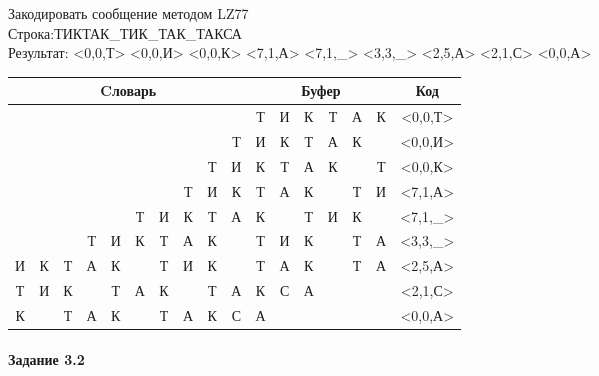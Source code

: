 \documentclass[a4paper, 12pt]{article}
\begin{document}
Закодировать сообщение методом LZ77\\
Строка:ТИКТАК\_ТИК\_ТАК\_ТАКСА\\
Результат: <0,0,Т> <0,0,И> <0,0,К> <7,1,А> <7,1,\_> <3,3,\_> <2,5,А> <2,1,С> <0,0,А>\\
\begin{table}[h!]
\centering
\begin{tabular}{|c|c|c|c|c|c|c|c|c|c|c|c|c|c|c|c|c|} 
\hline
\multicolumn{10}{|c|}{Cловарь} & \multicolumn{6}{c|}{Буфер} & Код  \\ \hline
  &   &   &   &   &   &   &   &   &   & \cellcolor[HTML]{8CE4F6} Т & И & К & Т & А & К & <0,0,Т>
\\ \hline
  &   &   &   &   &   &   &   &   & Т & \cellcolor[HTML]{8CE4F6} И & К & Т & А & К &   & <0,0,И>
\\ \hline
  &   &   &   &   &   &   &   & Т & И & \cellcolor[HTML]{8CE4F6} К & Т & А & К &   & Т & <0,0,К>
\\ \hline
  &   &   &   &   &   &   & \cellcolor[HTML]{FFFF00} Т & И & К & \cellcolor[HTML]{FFFF00} Т & \cellcolor[HTML]{8CE4F6} А & К &   & Т & И & <7,1,А>
\\ \hline
  &   &   &   &   & Т & И & \cellcolor[HTML]{FFFF00} К & Т & А & \cellcolor[HTML]{FFFF00} К & \cellcolor[HTML]{8CE4F6}   & Т & И & К &   & <7,1,\_>
\\ \hline
  &   &   & \cellcolor[HTML]{FFFF00} Т & \cellcolor[HTML]{FFFF00} И & \cellcolor[HTML]{FFFF00} К & Т & А & К &   & \cellcolor[HTML]{FFFF00} Т & \cellcolor[HTML]{FFFF00} И & \cellcolor[HTML]{FFFF00} К & \cellcolor[HTML]{8CE4F6}   & Т & А & <3,3,\_>
\\ \hline
И & К & \cellcolor[HTML]{FFFF00} Т & \cellcolor[HTML]{FFFF00} А & \cellcolor[HTML]{FFFF00} К & \cellcolor[HTML]{FFFF00}   & \cellcolor[HTML]{FFFF00} Т & И & К &   & \cellcolor[HTML]{FFFF00} Т & \cellcolor[HTML]{FFFF00} А & \cellcolor[HTML]{FFFF00} К & \cellcolor[HTML]{FFFF00}   & \cellcolor[HTML]{FFFF00} Т & \cellcolor[HTML]{8CE4F6} А & <2,5,А>
\\ \hline
Т & И & \cellcolor[HTML]{FFFF00} К &   & Т & А & К &   & Т & А & \cellcolor[HTML]{FFFF00} К & \cellcolor[HTML]{8CE4F6} С & А &   &   &   & <2,1,С>
\\ \hline
К &   & Т & А & К &   & Т & А & К & С & \cellcolor[HTML]{8CE4F6} А &   &   &   &   &   & <0,0,А>
\\ \hline
\end{tabular}
\end{table}

\paragraph{Задание 3.2}
\end{document}
